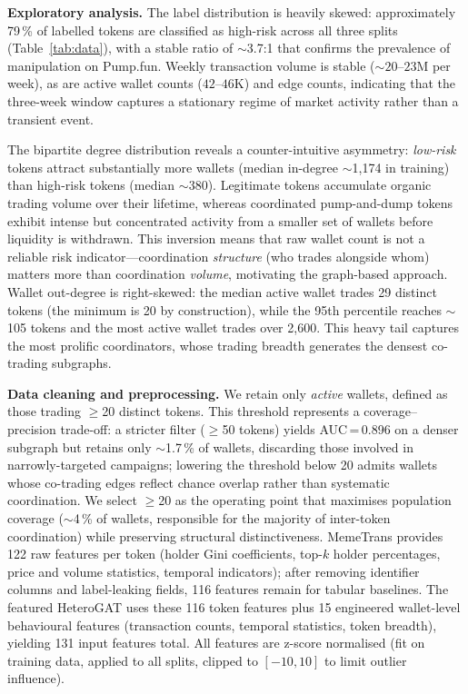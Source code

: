 \documentclass[10pt,journal]{IEEEtran}
\begin{document}
\smallskip\textbf{Exploratory analysis.}
The label distribution is heavily skewed: approximately 79\,\% of
labelled tokens are classified as high-risk across all three splits
(Table~\ref{tab:data}), with a stable ratio of ${\sim}$3.7{:}1 that
confirms the prevalence of manipulation on Pump.fun. Weekly
transaction volume is stable (${\sim}20$--$23$M per week), as are
active wallet counts ($42$--$46$K) and edge counts, indicating that
the three-week window captures a stationary regime of market activity
rather than a transient event.

The bipartite degree distribution reveals a counter-intuitive
asymmetry: \emph{low-risk} tokens attract substantially more wallets
(median in-degree ${\sim}$1{,}174 in training) than high-risk tokens
(median ${\sim}$380). Legitimate tokens accumulate organic trading
volume over their lifetime, whereas coordinated pump-and-dump tokens
exhibit intense but concentrated activity from a smaller set of
wallets before liquidity is withdrawn. This inversion means that raw
wallet count is not a reliable risk indicator---coordination
\emph{structure} (who trades alongside whom) matters more than
coordination \emph{volume}, motivating the graph-based approach.
Wallet out-degree is right-skewed: the median active wallet trades 29
distinct tokens (the minimum is 20 by construction), while the 95th
percentile reaches ${\sim}$105 tokens and the most active wallet
trades over 2{,}600. This heavy tail captures the most prolific
coordinators, whose trading breadth generates the densest co-trading
subgraphs.

\smallskip\textbf{Data cleaning and preprocessing.}
We retain only \emph{active} wallets, defined as those trading
$\geq$20 distinct tokens. This threshold represents a
coverage--precision trade-off: a stricter filter ($\geq$50 tokens)
yields AUC\,=\,0.896 on a denser subgraph but retains only
${\sim}$1.7\,\% of wallets, discarding those involved in
narrowly-targeted campaigns; lowering the threshold below 20 admits
wallets whose co-trading edges reflect chance overlap rather than
systematic coordination. We select $\geq$20 as the operating point
that maximises population coverage (${\sim}$4\,\% of wallets,
responsible for the majority of inter-token coordination) while
preserving structural distinctiveness. MemeTrans provides 122 raw
features per token (holder Gini coefficients, top-$k$ holder
percentages, price and volume statistics, temporal indicators); after
removing identifier columns and label-leaking fields, 116 features
remain for tabular baselines. The featured HeteroGAT uses these 116
token features plus 15 engineered wallet-level behavioural features
(transaction counts, temporal statistics, token breadth), yielding 131
input features total. All features are z-score normalised (fit on
training data, applied to all splits, clipped to $[-10,10]$ to limit
outlier influence).
\end{document}
